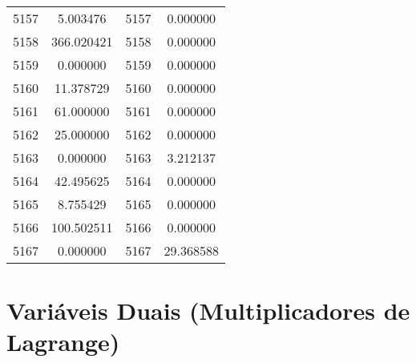 \documentclass[12pt]{article}
\begin{document}
\begin{longtable}{@{}cccc@{}}
5157 & 5.003476 & 5157 & 0.000000 \\
5158 & 366.020421 & 5158 & 0.000000 \\
5159 & 0.000000 & 5159 & 0.000000 \\
5160 & 11.378729 & 5160 & 0.000000 \\
5161 & 61.000000 & 5161 & 0.000000 \\
5162 & 25.000000 & 5162 & 0.000000 \\
5163 & 0.000000 & 5163 & 3.212137 \\
5164 & 42.495625 & 5164 & 0.000000 \\
5165 & 8.755429 & 5165 & 0.000000 \\
5166 & 100.502511 & 5166 & 0.000000 \\
5167 & 0.000000 & 5167 & 29.368588 \\

\end{longtable}

\section{Variáveis Duais (Multiplicadores de Lagrange)}
\end{document}
